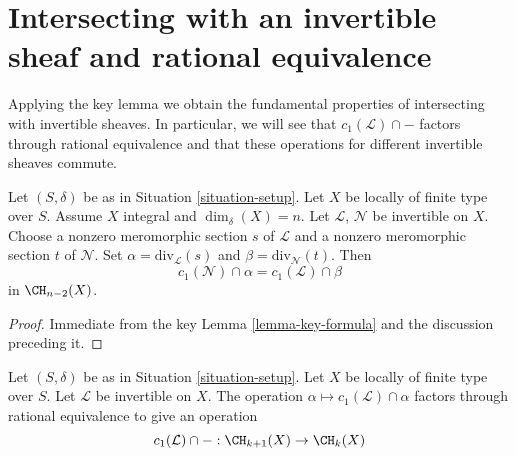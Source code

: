 \section{Intersecting with an invertible sheaf and rational equivalence}
\label{section-commutativity}

\noindent
Applying the key lemma we obtain the fundamental properties of intersecting
with invertible sheaves. In particular, we will see that
$c_1(\mathcal{L}) \cap -$ factors through rational equivalence and
that these operations for different invertible sheaves commute.

\begin{lemma}
\label{lemma-commutativity-on-integral}
Let $(S, \delta)$ be as in Situation \ref{situation-setup}.
Let $X$ be locally of finite type over $S$.
Assume $X$ integral and $\dim_\delta(X) = n$.
Let $\mathcal{L}$, $\mathcal{N}$ be invertible on $X$.
Choose a nonzero meromorphic section $s$ of $\mathcal{L}$
and a nonzero meromorphic section $t$ of $\mathcal{N}$.
Set $\alpha = \text{div}_\mathcal{L}(s)$ and
$\beta = \text{div}_\mathcal{N}(t)$.
Then
$$
c_1(\mathcal{N}) \cap \alpha
=
c_1(\mathcal{L}) \cap \beta
$$
in $\CH_{n - 2}(X)$.
\end{lemma}

\begin{proof}
Immediate from the key Lemma \ref{lemma-key-formula}
and the discussion preceding it.
\end{proof}

\begin{lemma}
\label{lemma-factors}
Let $(S, \delta)$ be as in Situation \ref{situation-setup}.
Let $X$ be locally of finite type over $S$.
Let $\mathcal{L}$ be invertible on $X$.
The operation $\alpha \mapsto c_1(\mathcal{L}) \cap \alpha$
factors through rational equivalence to give an operation
$$
c_1(\mathcal{L}) \cap - : \CH_{k + 1}(X) \to \CH_k(X)
$$
\end{lemma}

